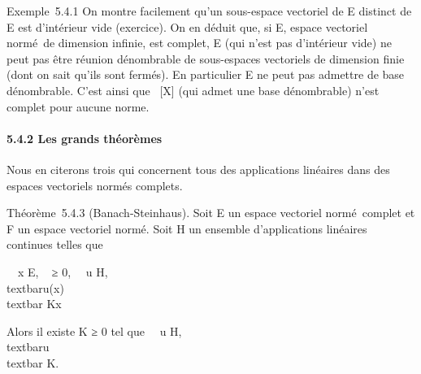 Exemple~5.4.1 On montre facilement qu'un sous-espace vectoriel de E
distinct de E est d'intérieur vide (exercice). On en déduit que, si E,
espace vectoriel normé~de dimension infinie, est complet, E (qui n'est
pas d'intérieur vide) ne peut pas être réunion dénombrable de
sous-espaces vectoriels de dimension finie (dont on sait qu'ils sont
fermés). En particulier E ne peut pas admettre de base dénombrable.
C'est ainsi que ~{[}X{]} (qui admet une base dénombrable) n'est complet
pour aucune norme.

\paragraph{5.4.2 Les grands théorèmes}

Nous en citerons trois qui concernent tous des applications linéaires
dans des espaces vectoriels normés complets.

Théorème~5.4.3 (Banach-Steinhaus). Soit E un espace vectoriel
normé~complet et F un espace vectoriel normé. Soit H un ensemble
d'applications linéaires continues telles que

\forall~~x \in E,
\existsKx~ ≥ 0,
\forall~~u \in H,\quad
\\textbar{}u(x)\\textbar{} \leq Kx

Alors il existe K ≥ 0 tel que \forall~~u \in H,
\\textbar{}u\\textbar{} \leq K.

